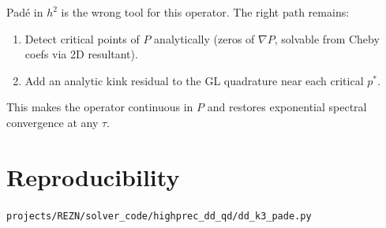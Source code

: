 \documentclass[11pt]{article}
\begin{document}
Pad\'e in $h^2$ is the wrong tool for this operator. The right path
remains:
\begin{enumerate}
  \item Detect critical points of $P$ analytically (zeros of $\nabla P$,
        solvable from Cheby coefs via 2D resultant).
  \item Add an analytic kink residual to the GL quadrature near each
        critical $p^*$.
\end{enumerate}
This makes the operator continuous in $P$ and restores exponential
spectral convergence at any $\tau$.

\section{Reproducibility}
\texttt{projects/REZN/solver\_code/highprec\_dd\_qd/dd\_k3\_pade.py}
\end{document}
